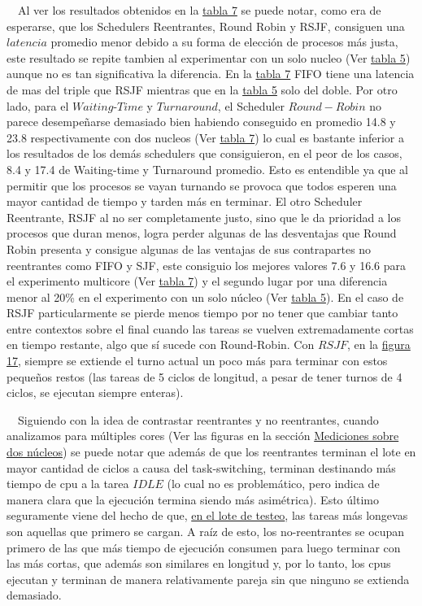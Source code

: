 \ \ Al ver los resultados obtenidos en la \hyperref[tab:tabla7]{tabla 7} se puede notar, como era de esperarse, que los Schedulers Reentrantes, Round Robin y RSJF, consiguen una $latencia$ promedio menor debido a su forma de elección de procesos más justa, este resultado se repite tambien al experimentar con un solo nucleo (Ver \hyperref[tab:tabla5]{tabla 5}) aunque no es tan significativa la diferencia. En la \hyperref[tab:tabla7]{tabla 7} FIFO tiene una latencia de mas del triple que RSJF mientras que en la \hyperref[tab:tabla5]{tabla 5} solo del doble. Por otro lado, para el $Waiting$-$Time$ y $Turnaround$, el Scheduler $Round-Robin$ no parece desempeñarse demasiado bien habiendo conseguido en promedio 14.8 y 23.8 respectivamente con dos nucleos (Ver \hyperref[tab:tabla7]{tabla 7}) lo cual es bastante inferior a los resultados de los demás schedulers que consiguieron, en el peor de los casos, 8.4 y 17.4 de Waiting-time y Turnaround promedio. Esto es entendible ya que al permitir que los procesos se vayan turnando se provoca que todos esperen una mayor cantidad de tiempo y tarden más en terminar. El otro Scheduler Reentrante, RSJF al no ser completamente justo, sino que le da prioridad a los procesos que duran menos, logra perder algunas de las desventajas que Round Robin presenta y consigue algunas de las ventajas de sus contrapartes no reentrantes como FIFO y SJF, este consiguio los mejores valores 7.6 y 16.6 para el experimento multicore (Ver \hyperref[tab:tabla7]{tabla 7}) y el segundo lugar por una diferencia menor al 20\% en el experimento con un solo núcleo (Ver \hyperref[tab:tabla5]{tabla 5}). En el caso de RSJF particularmente se pierde menos tiempo por no tener que cambiar tanto entre contextos sobre el final cuando las tareas se vuelven extremadamente cortas en tiempo restante, algo que sí sucede con Round-Robin. Con $RSJF$, en la \hyperref[fig:ej8-cpu-rsjf]{figura 17}, siempre se extiende el turno actual un poco más para terminar con estos pequeños restos (las tareas de 5 ciclos de longitud, a pesar de tener turnos de 4 ciclos, se ejecutan siempre enteras).

\ \ Siguiendo con la idea de contrastar reentrantes y no reentrantes, cuando analizamos para múltiples cores (Ver las figuras en la sección \hyperref[fig:ej8-cpu-rr-m]{Mediciones sobre dos núcleos}) se puede notar que además de que los reentrantes terminan el lote en mayor cantidad de ciclos a causa del task-switching, terminan destinando más tiempo de cpu a la tarea $IDLE$ (lo cual no es problemático, pero indica de manera clara que la ejecución termina siendo más asimétrica). Esto último seguramente viene del hecho de que, \hyperref[fig:ej8-intro]{en el lote de testeo}, las tareas más longevas son aquellas que primero se cargan. A raíz de esto, los no-reentrantes se ocupan primero de las que más tiempo de ejecución consumen para luego terminar con las más cortas, que además son similares en longitud y, por lo tanto, los cpus ejecutan y terminan de manera relativamente pareja sin que ninguno se extienda demasiado.
